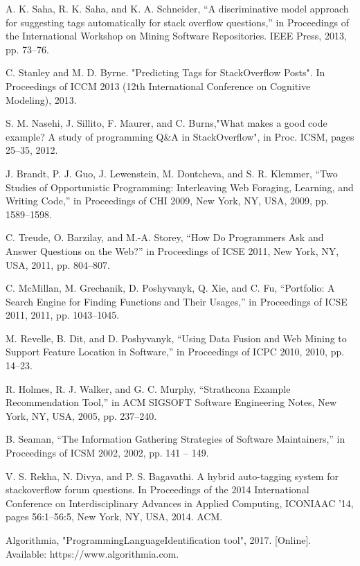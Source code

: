 \documentclass[letterpaper, 10 pt, conference]{ieeeconf}  %
\begin{document}
\begin{thebibliography}{99}%
 
 A. K. Saha, R. K. Saha, and K. A. Schneider, “A discriminative model approach for suggesting tags automatically for stack overflow questions,” in Proceedings of the International Workshop on Mining Software Repositories. IEEE Press, 2013, pp. 73–76.
 
 C. Stanley and M. D. Byrne. "Predicting Tags for StackOverflow Posts". In
Proceedings of ICCM 2013 (12th International Conference on Cognitive Modeling), 2013.
 
 S. M. Nasehi, J. Sillito, F. Maurer, and C. Burns,"What makes a good code example? A study of programming Q\&A in StackOverflow", in Proc. ICSM, pages 25–35, 2012.
 
 J. Brandt, P. J. Guo, J. Lewenstein, M. Dontcheva, and S. R. Klemmer, “Two Studies of Opportunistic Programming: Interleaving Web Foraging, Learning, and Writing Code,” in Proceedings of CHI 2009, New York, NY, USA, 2009, pp. 1589–1598.
 
 C. Treude, O. Barzilay, and M.-A. Storey, “How Do Programmers Ask and Answer Questions on the Web?” in Proceedings of ICSE 2011, New York, NY, USA, 2011, pp. 804–807.
 
C. McMillan, M. Grechanik, D. Poshyvanyk, Q. Xie, and C. Fu, “Portfolio: A Search Engine for Finding Functions and Their Usages,” in Proceedings of ICSE 2011, 2011, pp. 1043–1045.
 
M. Revelle, B. Dit, and D. Poshyvanyk, “Using Data Fusion and Web Mining to Support Feature Location in Software,” in Proceedings of ICPC 2010, 2010, pp. 14–23.
 
 R. Holmes, R. J. Walker, and G. C. Murphy, “Strathcona Example Recommendation Tool,” in ACM SIGSOFT Software Engineering Notes, New York, NY, USA, 2005, pp. 237–240.
 
 B. Seaman, “The Information Gathering Strategies of Software Maintainers,” in Proceedings of ICSM 2002, 2002, pp. 141 – 149.
 
V. S. Rekha, N. Divya, and P. S. Bagavathi. A hybrid auto-tagging system for stackoverflow forum questions. In Proceedings of the 2014 International Conference on Interdisciplinary Advances in Applied Computing, ICONIAAC ’14, pages 56:1–56:5, New York, NY, USA, 2014. ACM.
 
 Algorithmia, "ProgrammingLanguageIdentification tool", 2017. [Online]. Available: https://www.algorithmia.com.
 

\end{thebibliography}
\end{document}
